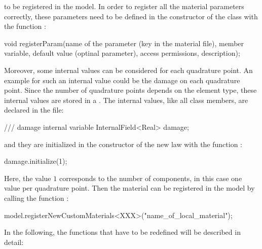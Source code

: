 to be registered in the model. In order to register all the material
parameters correctly, these parameters need to be defined in the
constructor of the class with the function
:
\begin{cpp} 
void registerParam(name of the parameter (key in the material file), 
                   member variable, 
                   default value (optinal parameter),
                   access permissions,
                   description);
\end{cpp} 
Moreover, some internal values can be considered for each
quadrature point. An example for such an internal value could be the
damage on each quadrature point. Since the number of quadrature points
depends on the element type, these internal values are stored in a
. The internal values, like all class
members, are declared in the  file:
\begin{cpp} 
/// damage internal variable 
InternalField<Real> damage;
\end{cpp} 
and they are initialized in the constructor of the new law with
the function :
\begin{cpp} 
damage.initialize(1);
\end{cpp} 
Here, the value $1$ corresponds to the number of components,
in this case one value per quadrature point. Then the material
can be registered in the model by calling the function
:
\begin{cpp}
model.registerNewCustomMaterials<XXX>("name_of_local_material");
\end{cpp} In the following, the functions that have to be redefined
will be described in detail:
